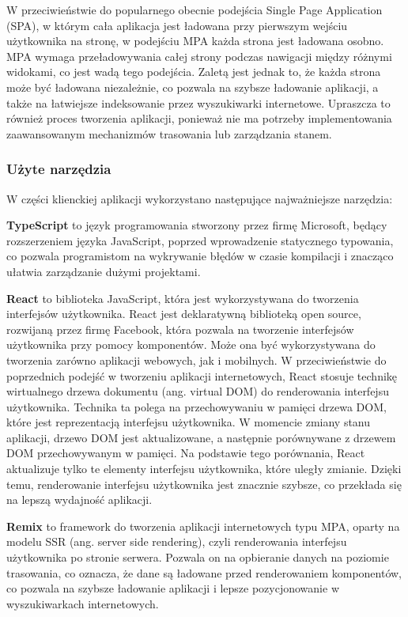 W przeciwieństwie do popularnego obecnie podejścia Single Page Application (SPA), w którym cała aplikacja jest ładowana przy pierwszym wejściu użytkownika na stronę, w podejściu MPA każda strona jest ładowana osobno. MPA wymaga przeładowywania całej strony podczas nawigacji między różnymi widokami, co jest wadą tego podejścia. Zaletą jest jednak to, że każda strona może być ładowana niezależnie, co pozwala na szybsze ładowanie aplikacji, a także na łatwiejsze indeksowanie przez wyszukiwarki internetowe. Upraszcza to również proces tworzenia aplikacji, ponieważ nie ma potrzeby implementowania zaawansowanym mechanizmów trasowania lub zarządzania stanem.

\subsubsection{Użyte narzędzia}

W części klienckiej aplikacji wykorzystano następujące najważniejsze narzędzia:

\textbf{TypeScript} \cite{typescript} to język programowania stworzony przez firmę Microsoft, będący rozszerzeniem języka JavaScript, poprzed wprowadzenie statycznego typowania, co pozwala programistom na wykrywanie błędów w czasie kompilacji i znacząco ułatwia zarządzanie dużymi projektami. 

\textbf{React} \cite{react} to biblioteka JavaScript, która jest wykorzystywana do tworzenia interfejsów użytkownika. React jest deklaratywną biblioteką open source, rozwijaną przez firmę Facebook, która pozwala na tworzenie interfejsów użytkownika przy pomocy komponentów. Może ona być wykorzystywana do tworzenia zarówno aplikacji webowych, jak i mobilnych. W przeciwieństwie do poprzednich podejść w tworzeniu aplikacji internetowych, React stosuje technikę wirtualnego drzewa dokumentu (ang. virtual DOM) do renderowania interfejsu użytkownika. Technika ta polega na przechowywaniu w pamięci drzewa DOM, które jest reprezentacją interfejsu użytkownika. W momencie zmiany stanu aplikacji, drzewo DOM jest aktualizowane, a następnie porównywane z drzewem DOM przechowywanym w pamięci. Na podstawie tego porównania, React aktualizuje tylko te elementy interfejsu użytkownika, które uległy zmianie. Dzięki temu, renderowanie interfejsu użytkownika jest znacznie szybsze, co przekłada się na lepszą wydajność aplikacji.

\textbf{Remix} \cite{remix} to framework do tworzenia aplikacji internetowych typu MPA, oparty na modelu SSR (ang. server side rendering), czyli renderowania interfejsu użytkownika po stronie serwera. Pozwala on na opbieranie danych na poziomie trasowania, co oznacza, że dane są ładowane przed renderowaniem komponentów, co pozwala na szybsze ładowanie aplikacji i lepsze pozycjonowanie w wyszukiwarkach internetowych.

